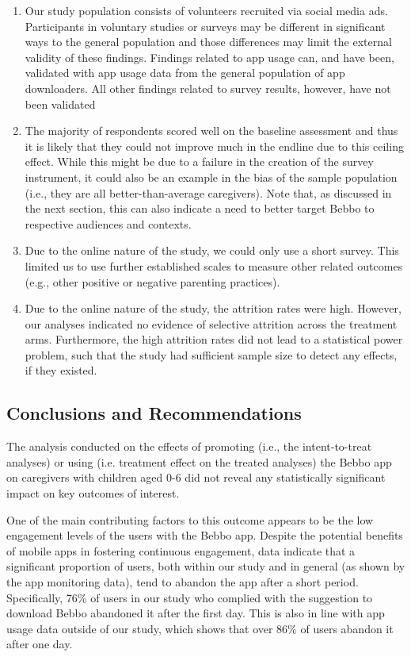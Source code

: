 \begin{enumerate}
\item Our study population consists of volunteers recruited via social media ads. Participants in voluntary studies or surveys may be different in significant ways to the general population and those differences may limit the external validity of these findings. Findings related to app usage can, and have been, validated with app usage data from the general population of app downloaders. All other findings related to survey results, however, have not been validated
\item The majority of respondents scored well on the baseline assessment and thus it is likely that they could not improve much in the endline due to this ceiling effect. While this might be due to a failure in the creation of the survey instrument, it could also be an example in the bias of the sample population (i.e., they are all better-than-average caregivers). Note that, as discussed in the next section, this can also indicate a need to better target Bebbo to respective audiences and contexts.
\item Due to the online nature of the study, we could only use a short survey. This limited us to use further established scales to measure other related outcomes (e.g., other positive or negative parenting practices).
\item Due to the online nature of the study, the attrition rates were high. However, our analyses indicated no evidence of selective attrition across the treatment arms. Furthermore, the high attrition rates did not lead to a statistical power problem, such that the study had sufficient sample size to detect any effects, if they existed.
\end{enumerate}


\subsection{Conclusions and Recommendations}

The analysis conducted on the effects of promoting (i.e., the intent-to-treat analyses) or using (i.e. treatment effect on the treated analyses) the Bebbo app on caregivers with children aged 0-6 did not reveal any statistically significant impact on key outcomes of interest.

One of the main contributing factors to this outcome appears to be the low engagement levels of the users with the Bebbo app. Despite the potential benefits of mobile apps in fostering continuous engagement, data indicate that a significant proportion of users, both within our study and in general (as shown by the app monitoring data), tend to abandon the app after a short period. Specifically, 76\% of users in our study who complied with the suggestion to download Bebbo abandoned it after the first day. This is also in line with app usage data outside of our study, which shows that over 86\% of users abandon it after one day.

